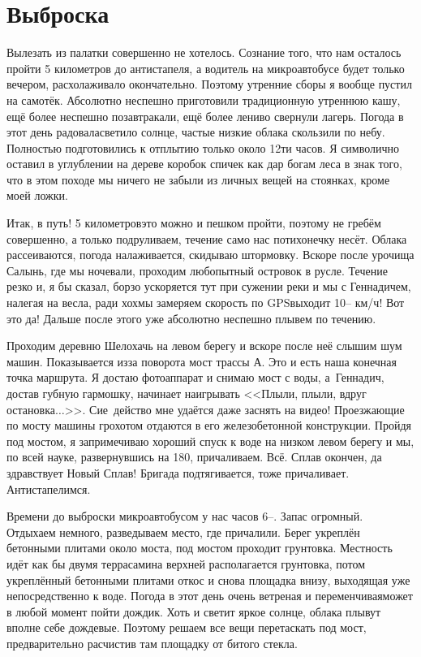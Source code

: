 \chapter{Выброска} 

Вылезать из палатки совершенно не хотелось. Сознание того, что нам осталось пройти 5 километров до антистапеля, а водитель на микроавтобусе будет только вечером, расхолаживало окончательно. Поэтому утренние сборы я вообще пустил на самотёк. Абсолютно неспешно приготовили традиционную утреннюю кашу, ещё более неспешно позавтракали, ещё более лениво свернули лагерь. Погода в этот день радовала\mdash светило солнце, частые низкие облака скользили по небу. Полностью подготовились к отплытию только около 12\sdash ти часов. Я символично оставил в углублении на дереве коробок спичек как дар богам леса в знак того, что в этом походе мы ничего не забыли из личных вещей на стоянках, кроме моей ложки.

Итак, в путь! 5 километров\mdash это можно и пешком пройти, поэтому не гребём совершенно, а только подруливаем, течение само нас потихонечку несёт. Облака рассеиваются, погода налаживается, скидываю штормовку. Вскоре после урочища Салынь, где мы ночевали, проходим любопытный островок в русле. Течение резко и, я бы сказал, борзо ускоряется тут при сужении реки и мы с Геннадичем, налегая на весла, ради хохмы замеряем скорость по GPS\mdash выходит 10\thinspace\nobreakdash-- км/ч! Вот это да! Дальше после этого уже абсолютно неспешно плывем по течению. 

Проходим деревню Шелохачь на левом берегу и вскоре после неё слышим шум машин. Показывается из\sdash за поворота мост трассы А. Это и есть наша конечная точка маршрута. Я достаю фотоаппарат и снимаю мост с воды, а~Геннадич, достав губную гармошку, начинает наигрывать <<Плыли, плыли, вдруг остановка$\ldots$>>. Сие~действо мне удаётся даже заснять на видео! Проезжающие по мосту машины грохотом отдаются в его железобетонной конструкции. Пройдя под мостом, я запримечиваю хороший спуск к воде на низком левом берегу и мы, по всей науке, развернувшись на 180, причаливаем. Всё. Сплав окончен, да здравствует Новый Сплав! Бригада подтягивается, тоже причаливает. Антистапелимся.

Времени до выброски микроавтобусом у нас часов 6\thinspace\nobreakdash--. Запас огромный. Отдыхаем немного, разведываем место, где причалили. Берег укреплён бетонными плитами около моста, под мостом проходит грунтовка. Местность идёт как бы двумя террасами\mdash на верхней располагается грунтовка, потом укреплённый бетонными плитами откос и снова площадка внизу, выходящая уже непосредственно к воде. Погода в этот день очень ветреная  и переменчивая\mdash может в любой момент пойти дождик. Хоть и светит яркое солнце, облака плывут вполне себе дождевые. Поэтому решаем все вещи перетаскать под мост, предварительно расчистив там площадку от битого стекла. 

